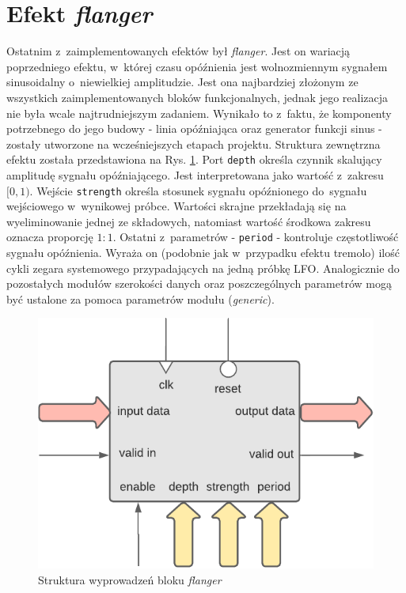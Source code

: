 \section{Efekt \textit{flanger}}

Ostatnim z~zaimplementowanych efektów był \textit{flanger}. Jest on wariacją poprzedniego efektu, w~której czasu opóźnienia jest wolnozmiennym sygnałem sinusoidalny o~niewielkiej amplitudzie. Jest ona najbardziej złożonym ze wszystkich zaimplementowanych bloków funkcjonalnych, jednak jego realizacja nie była wcale najtrudniejszym zadaniem. Wynikało to z~faktu, że komponenty potrzebnego do jego budowy - linia opóźniająca oraz generator funkcji sinus - zostały utworzone na wcześniejszych etapach projektu. Struktura zewnętrzna efektu została przedstawiona na Rys. \ref{flanger-structure}. Port \verb|depth| określa czynnik skalujący amplitudę sygnału opóźniającego. Jest interpretowana jako wartość z~zakresu $[0,1)$. Wejście \verb|strength| określa stosunek sygnału opóźnionego do~sygnału wejściowego w~wynikowej próbce. Wartości skrajne przekładają się na wyeliminowanie jednej ze składowych, natomiast wartość środkowa zakresu oznacza proporcję $1:1$. Ostatni z~parametrów - \verb|period| - kontroluje częstotliwość sygnału opóźnienia. Wyraża on (podobnie jak w~przypadku efektu tremolo) ilość cykli zegara systemowego przypadających na jedną próbkę LFO. Analogicznie do pozostałych modułów szerokości danych oraz poszczególnych parametrów mogą być ustalone za pomoca parametrów modułu (\textit{generic}).

\vspace{0.5cm}
\begin{figure}[ht]
    \centering
    \includegraphics[scale=0.75]{img/diagrams/flanger.pdf}
    \captionsetup{format=plain,justification=centering}
    \caption{Struktura wyprowadzeń bloku \textit{flanger}}
    \label{flanger-structure}
\end{figure}
\vspace{0.5cm}

